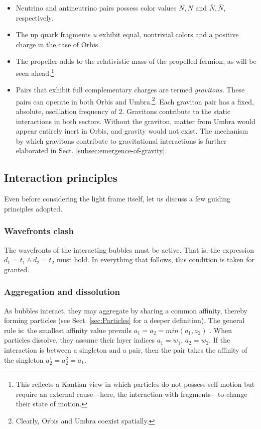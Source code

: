 \documentclass[12pt,english]{article}
\begin{document}
\begin{itemize}
    \item Neutrino and antineutrino pairs possess color values $N, N$ and $\bar{N}, \bar{N}$, respectively.

    \item The up quark fragments $u$ exhibit equal, nontrivial colors and a positive charge in the case of Orbis. 

    \item The propeller adds to the relativistic mass of the propelled fermion, as will be seen ahead.\footnote{This reflects a Kantian view in which particles do not possess self-motion but require an external cause—here, the interaction with fragments—to change their state of motion.}

    \item Pairs that exhibit full complementary charges are termed \emph{gravitons}. These pairs can operate in both Orbis and Umbra.\footnote{Clearly, Orbis and Umbra coexist spatially.}. Each graviton pair has a fixed, absolute, oscillation frequency of $2$. Gravitons contribute to the static interactions in both sectors. Without the graviton, matter from Umbra would appear entirely inert in Orbis, and gravity would not exist. The mechanism by which gravitons contribute to gravitational interactions is further elaborated in Sect. \ref{subsec:emergence-of-gravity}.
\end{itemize}

\subsection{Interaction principles}
Even before considering the light frame itself, let us discuss a few guiding principles adopted.

\subsubsection{Wavefronts clash}
The wavefronts of the interacting bubbles must be active. That is, the expression $d_1 = t_1 \wedge d_2 = t_2$ must hold. In everything that follows, this condition is taken for granted.

\subsubsection{Aggregation and dissolution}\label{subsec-role-of-affinity}

As bubbles interact, they may aggregate by sharing a common affinity, thereby forming particles (see Sect. \ref{sec:Particles} for a deeper definition). The general rule is: the smallest affinity value prevails $a_1=a_2=min(a_1,a_2)$ . When particles dissolve, they assume their layer indices $a_1 = w_1, \, a_2 = w_2$. If the interaction is between a singleton and a pair, then the pair takes the affinity of the singleton $a_2^1=a_2^2=a_1$.
\end{document}
